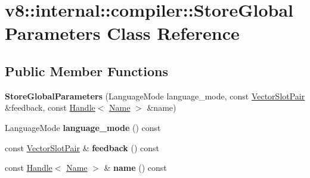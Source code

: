 \hypertarget{classv8_1_1internal_1_1compiler_1_1_store_global_parameters}{}\section{v8\+:\+:internal\+:\+:compiler\+:\+:Store\+Global\+Parameters Class Reference}
\label{classv8_1_1internal_1_1compiler_1_1_store_global_parameters}
\subsection*{Public Member Functions}
\begin{DoxyCompactItemize}
\item 
{\bfseries Store\+Global\+Parameters} (Language\+Mode language\+\_\+mode, const \hyperlink{classv8_1_1internal_1_1compiler_1_1_vector_slot_pair}{Vector\+Slot\+Pair} \&feedback, const \hyperlink{classv8_1_1internal_1_1_handle}{Handle}$<$ \hyperlink{classv8_1_1internal_1_1_name}{Name} $>$ \&name)\hypertarget{classv8_1_1internal_1_1compiler_1_1_store_global_parameters_a108b2a749f8dbbb45bd65b660f8e016b}{}\label{classv8_1_1internal_1_1compiler_1_1_store_global_parameters_a108b2a749f8dbbb45bd65b660f8e016b}

\item 
Language\+Mode {\bfseries language\+\_\+mode} () const \hypertarget{classv8_1_1internal_1_1compiler_1_1_store_global_parameters_a0e91406eae5976f603843deb4715862f}{}\label{classv8_1_1internal_1_1compiler_1_1_store_global_parameters_a0e91406eae5976f603843deb4715862f}

\item 
const \hyperlink{classv8_1_1internal_1_1compiler_1_1_vector_slot_pair}{Vector\+Slot\+Pair} \& {\bfseries feedback} () const \hypertarget{classv8_1_1internal_1_1compiler_1_1_store_global_parameters_a66ce39b62489ed4543d35bd079c37571}{}\label{classv8_1_1internal_1_1compiler_1_1_store_global_parameters_a66ce39b62489ed4543d35bd079c37571}

\item 
const \hyperlink{classv8_1_1internal_1_1_handle}{Handle}$<$ \hyperlink{classv8_1_1internal_1_1_name}{Name} $>$ \& {\bfseries name} () const \hypertarget{classv8_1_1internal_1_1compiler_1_1_store_global_parameters_aa201823a5b18cdcc0363b93601f4f692}{}\label{classv8_1_1internal_1_1compiler_1_1_store_global_parameters_aa201823a5b18cdcc0363b93601f4f692}

\end{DoxyCompactItemize}
